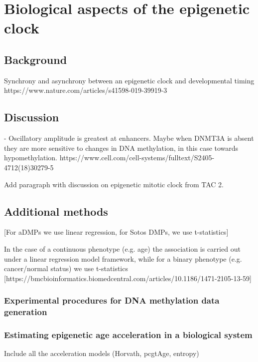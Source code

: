 
\chapter{Biological aspects of the epigenetic clock}  \label{c:3}

\ifpdf
    \graphicspath{{Chapter3/Figs/Raster/}{Chapter3/Figs/PDF/}{Chapter3/Figs/}}
\else
    \graphicspath{{Chapter3/Figs/Vector/}{Chapter3/Figs/}}
\fi


\section{Background} 

Synchrony and asynchrony between an epigenetic clock and developmental timing
https://www.nature.com/articles/s41598-019-39919-3

\section{Discussion}

- Oscillatory amplitude is greatest at enhancers.  Maybe when DNMT3A is absent they are more sensitive to changes in DNA methylation, in this case towards hypomethylation. 
https://www.cell.com/cell-systems/fulltext/S2405-4712(18)30279-5

Add paragraph with discussion on epigenetic mitotic clock from TAC 2.


\section{Additional methods}

[For aDMPs we use linear regression, for Sotos DMPs, we use t-statistics]

In the case of a continuous phenotype (e.g. age) the association is carried out under a linear regression model framework, while for a binary phenotype (e.g. cancer/normal status) we use t-statistics [https://bmcbioinformatics.biomedcentral.com/articles/10.1186/1471-2105-13-59]

\subsection*{Experimental procedures for DNA methylation data generation}
\subsection*{Estimating epigenetic age acceleration in a biological system}

Include all the acceleration models (Horvath, pcgtAge, entropy)


